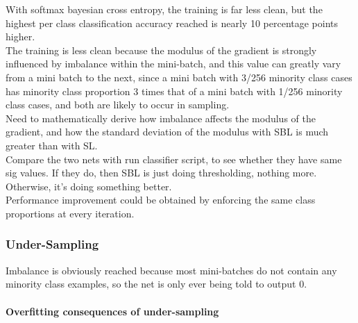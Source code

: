\documentclass[a4paper,11pt]{article}
\begin{document}
With softmax bayesian cross entropy, the training is far less clean, but the highest per class classification accuracy reached is nearly 10 percentage points higher. \\

The training is less clean because the modulus of the gradient is strongly influenced by imbalance within the mini-batch, and this value can greatly vary from a mini batch to the next, since a mini batch with 3/256 minority class cases has minority class proportion 3 times that of a mini batch with 1/256 minority class cases, and both are likely to occur in sampling. \\

Need to mathematically derive how imbalance affects the modulus of the gradient, and how the standard deviation of the modulus with SBL is much greater than with SL. \\

Compare the two nets with run classifier script, to see whether they have same sig values. If they do, then SBL is just doing thresholding, nothing more. Otherwise, it's doing something better. \\

Performance improvement could be obtained by enforcing the same class proportions at every iteration. \\


\subsubsection{Under-Sampling}

Imbalance is obviously reached because most mini-batches do not contain any minority class examples, so the net is only ever being told to output 0. 

%


\paragraph{Overfitting consequences of under-sampling}
\end{document}

